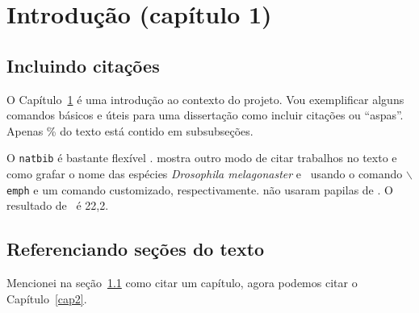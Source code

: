 \cleardoublepage

\pagestyle{fancy}


\chapter{Introdução (capítulo 1)}\label{intro}

\section{Incluindo citações}\label{intro:historico}

O Capítulo~\ref{intro} é uma introdução ao contexto do projeto.
Vou exemplificar alguns comandos básicos e úteis para uma dissertação como incluir citações  ou ``aspas''.
Apenas \unit[4]{\%} do texto está contido em subsubseções.

O \texttt{natbib} é bastante flexível \cite{Kirk2008}.
 mostra outro modo de citar trabalhos no texto e como grafar o nome das espécies \emph{Drosophila melagonaster} e \subde\ usando o comando \texttt{$\backslash$emph} e um comando customizado, respectivamente.
 não usaram papilas de \subsus.
O resultado de \subsus\ é 22,2.

\section{Referenciando seções do texto}\label{intro:contexto}

Mencionei na seção~\ref{intro:historico} como citar um capítulo, agora podemos citar o Capítulo~\ref{cap2}.